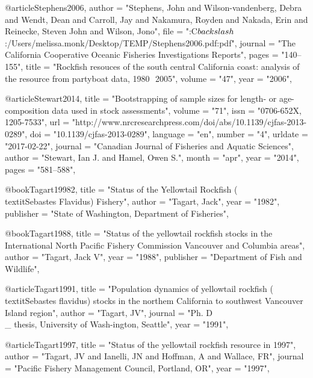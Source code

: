 @article{Stephens2006,
    author = "{Stephens, John and Wilson-vandenberg, Debra and Wendt, Dean and Carroll, Jay and Nakamura, Royden and Nakada, Erin and Reinecke, Steven John and Wilson, Jono}",
    file = "{:C$\\backslash$:/Users/melissa.monk/Desktop/TEMP/Stephens2006.pdf:pdf}",
    journal = "{The California Cooperative Oceanic Fisheries Investigations Reports}",
    pages = "{140--155}",
    title = "{{Rockfish resouces of the south central California coast: analysis of the resource from partyboat data, 1980  2005}}",
    volume = "{47}",
    year = "{2006}",
}

@article{Stewart2014,
    title = "{Bootstrapping of sample sizes for length- or age-composition data used in stock assessments}",
    volume = "{71}",
    issn = "{0706-652X, 1205-7533}",
    url = "{http://www.nrcresearchpress.com/doi/abs/10.1139/cjfas-2013-0289}",
    doi = "{10.1139/cjfas-2013-0289}",
    language = "{en}",
    number = "{4}",
    urldate = "{2017-02-22}",
    journal = "{Canadian Journal of Fisheries and Aquatic Sciences}",
    author = "{Stewart, Ian J. and Hamel, Owen S.}",
    month = "apr",
    year = "{2014}",
    pages = "{581--588}",
}

@book{Tagart19982,
    title = "{Status of the Yellowtail Rockfish (\\textit{{Sebastes} Flavidus}) Fishery}",
    author = "{Tagart, Jack}",
    year = "{1982}",
    publisher = "{State of Washington, Department of Fisheries}",
}

@book{Tagart1988,
    title = "{Status of the yellowtail rockfish stocks in the International North Pacific Fishery Commission Vancouver and Columbia areas}",
    author = "{Tagart, Jack V}",
    year = "{1988}",
    publisher = "{Department of Fish and Wildlife}",
}

@article{Tagart1991,
    title = "{Population dynamics of yellowtail rockfish (\\textit{{Sebastes} flavidus}) stocks in the northem California to southwest Vancouver Island region}",
    author = "{Tagart, JV}",
    journal = "{Ph. D\\_ thesis, University of Wash-ington, Seattle}",
    year = "{1991}",
}

@article{Tagart1997,
    title = "{Status of the yellowtail rockfish resource in 1997}",
    author = "{Tagart, JV and Ianelli, JN and Hoffman, A and Wallace, FR}",
    journal = "{Pacific Fishery Management Council, Portland, OR}",
    year = "{1997}",
}

